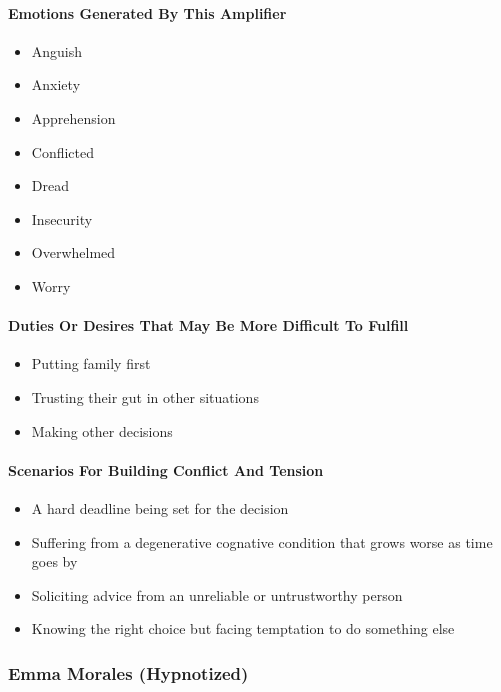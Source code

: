 \paragraph{Emotions Generated By This Amplifier}

\begin{itemize}
    \item Anguish
    \item Anxiety
    \item Apprehension
    \item Conflicted
    \item Dread
    \item Insecurity
    \item Overwhelmed
    \item Worry
\end{itemize}

\paragraph{Duties Or Desires That May Be More Difficult To Fulfill}

\begin{itemize}
    \item Putting family first
    \item Trusting their gut in other situations
    \item Making other decisions
\end{itemize}

\paragraph{Scenarios For Building Conflict And Tension}

\begin{itemize}
    \item A hard deadline being set for the decision
    \item Suffering from a degenerative cognative condition that grows worse as time goes by
    \item Soliciting advice from an unreliable or untrustworthy person
    \item Knowing the right choice but facing temptation to do something else
\end{itemize}

\subsubsection{Emma Morales (Hypnotized)}

